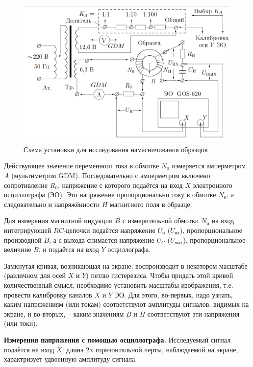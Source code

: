 \documentclass[a4paper, 12pt]{article}
\begin{document}
\begin{figure}[h]
	\centering
	\includegraphics[scale=0.35]{Device}
	\caption{Схема установки для исследования намагничивания образцов} \label{Device}
\end{figure}

Действующее значение переменного тока в обмотке $N_0$ измеряется амперметром $A$ (мультиметром GDM). Последовательно с амперметром включено сопротивление $R_0$, напряжение с которого подаётся на вход $X$ электронного осциллографа (ЭО). Это напряжение пропорционально току в обмотке $N_0$, а следовательно и напряжённости $H$ магнитного поля в образце.

Для измерения магнитной индукции $B$ с измерительной обмотки $N_{\text{и}}$ на вход интегрирующей $RC$-цепочки подаётся напряжение $U_{\text{и}}$ ($U_{\text{вх}}$), пропорциональное производной $\dot{B}$, а с выхода снимается напряжение $U_C$ ($U_{\text{вых}}$), пропорциональное величине $B$, и подаётся на вход $Y$ осциллографа.

Замкнутая кривая, возникающая на экране, воспроизводит в некотором масштабе (различном для осей $X$ и $Y$) петлю гистерезиса. Чтобы придать этой кривой количественный смысл, необходимо установить масштабы изображения, т.е. провести калибровку каналов $X$ и $Y$ ЭО. Для этого, во-первых, надо узнать, каким напряжениям (или токам) соответствуют амплитуды сигналов, видимых на экране, и во-вторых, -- каким значениям $B$ и $H$ соответствуют эти напряжения (или токи).

\textbf{Измерения напряжения с помощью осциллографа.} Исследуемый сигнал подаётся на вход $X$: длина $2x$ горизонтальной черты, наблюдаемой на экране, характризует удвоенную амплитуду сигнала.
\end{document}
